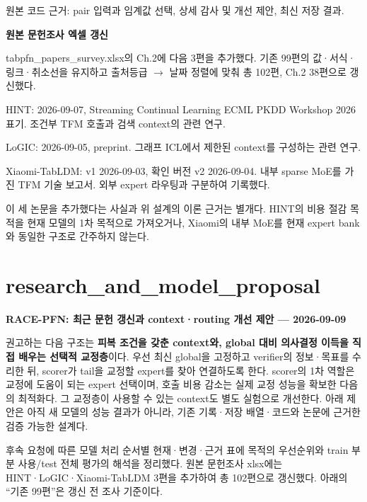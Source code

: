 원본 코드 근거: pair 입력과 임계값 선택, 상세 감사 및 개선 제안, 최신 저장 결과.

\textbf{원본 문헌조사 엑셀 갱신}

tabpfn\_\allowbreak{}papers\_\allowbreak{}survey.xlsx의 Ch.2에 다음 3편을 추가했다. 기존 99편의 값·서식·링크·취소선을 유지하고 출처등급 \ensuremath{\rightarrow} 날짜 정렬에 맞춰 총 102편, Ch.2 38편으로 갱신했다.

\par\noindent \textbullet\enspace HINT: 2026-09-07, Streaming Continual Learning ECML PKDD Workshop 2026 표기. 조건부 TFM 호출과 검색 context의 관련 연구.


\par\noindent \textbullet\enspace LoGIC: 2026-09-05, preprint. 그래프 ICL에서 제한된 context를 구성하는 관련 연구.


\par\noindent \textbullet\enspace Xiaomi-TabLDM: v1 2026-09-03, 확인 버전 v2 2026-09-04. 내부 sparse MoE를 가진 TFM 기술 보고서. 외부 expert 라우팅과 구분하여 기록했다.


이 세 논문을 추가했다는 사실과 위 설계의 이론 근거는 별개다. HINT의 비용 절감 목적을 현재 모델의 1차 목적으로 가져오거나, Xiaomi의 내부 MoE를 현재 expert bank와 동일한 구조로 간주하지 않는다.



\section{research\_\allowbreak{}and\_\allowbreak{}model\_\allowbreak{}proposal}
\textbf{RACE-PFN: 최근 문헌 갱신과 context·routing 개선 제안 — 2026-09-09}

권고하는 다음 구조는 \textbf{피복 조건을 갖춘 context와, global 대비 의사결정 이득을 직접 배우는 선택적 교정층}이다. 우선 최신 global을 고정하고 verifier의 정보·목표를 수리한 뒤, scorer가 tail을 교정할 expert를 찾아 연결하도록 한다. scorer의 1차 역할은 교정에 도움이 되는 expert 선택이며, 호출 비용 감소는 실제 교정 성능을 확보한 다음의 최적화다. 그 교정층이 사용할 수 있는 context도 별도 실험으로 개선한다. 아래 제안은 아직 새 모델의 성능 결과가 아니라, 기존 기록·저장 배열·코드와 논문에 근거한 검증 가능한 설계다.

후속 요청에 따른 모델 처리 순서별 현재·변경·근거 표에 목적의 우선순위와 train 부분 사용/\allowbreak{}test 전체 평가의 해석을 정리했다. 원본 문헌조사 xlsx에는 HINT·LoGIC·Xiaomi-TabLDM 3편을 추가하여 총 102편으로 갱신했다. 아래의 “기존 99편”은 갱신 전 조사 기준이다.

